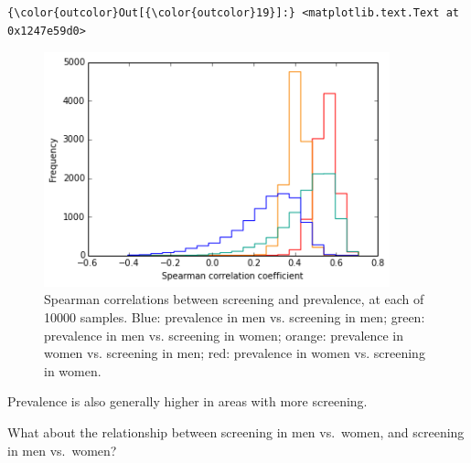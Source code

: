 \documentclass{article}
\begin{document}
    \begin{footnotesize}
            \begin{Verbatim}[commandchars=\\\{\}]
{\color{outcolor}Out[{\color{outcolor}19}]:} <matplotlib.text.Text at 0x1247e59d0>
\end{Verbatim}
    \end{footnotesize}
        
    \begin{figure}
        \begin{center}\includegraphics[width=10cm]{local_authorities_files/local_authorities_35_1.png}\end{center}
        \caption{Spearman correlations between screening and prevalence, at each of 10000 samples. Blue: prevalence in men vs. screening in men; green: prevalence in men vs. screening in women; orange: prevalence in women vs. screening in men; red: prevalence in women vs. screening in women.}
        \label{}
    \end{figure}
    
    Prevalence is also generally higher in areas with more screening.

What about the relationship between screening in men vs.~women, and
screening in men vs.~women?
\end{document}
